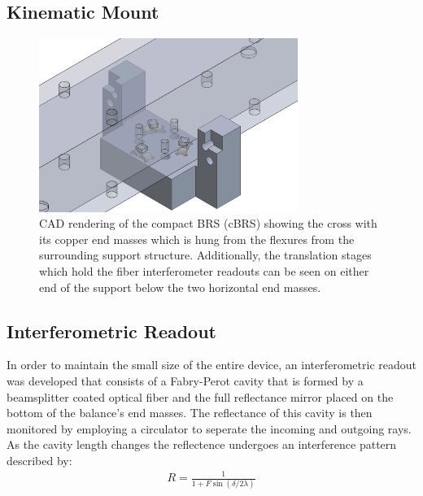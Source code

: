 \documentclass [12pt, proquest]{uwthesis}[2019]
\begin{document}
\subsection{Kinematic Mount}

\begin{figure}[!h]
\begin{center}
\includegraphics[width=0.75\textwidth]{cBRSKMount.png}
\end{center}
\caption{CAD rendering of the compact BRS (cBRS) showing the cross with its copper end masses which is hung from the flexures from the surrounding support structure. Additionally, the translation stages which hold the fiber interferometer readouts can be seen on either end of the support below the two horizontal end masses.}
\end{figure}

\subsection{Interferometric Readout}
In order to maintain the small size of the entire device, an interferometric readout was developed that consists of a Fabry-Perot cavity that is formed by a beamsplitter coated optical fiber and the full reflectance mirror placed on the bottom of the balance's end masses. The reflectance of this cavity is then monitored by employing a circulator to seperate the incoming and outgoing rays. As the cavity length changes the reflectence undergoes an interference pattern described by:
\begin{align}
R=\frac{1}{1+F \sin(\delta/2 \lambda)}
\end{align}
\end{document}
